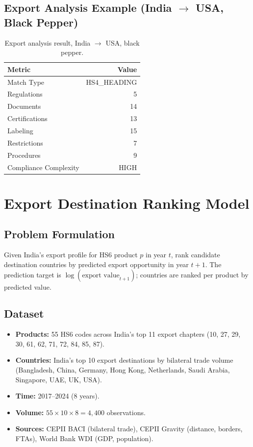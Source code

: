 \documentclass[conference]{IEEEtran}
\newcommand{\arrowto}{$\rightarrow$}
\begin{document}
\subsection{Export Analysis Example (India \arrowto{} USA, Black Pepper)}
\begin{table}[h]
\centering
\caption{Export analysis result, India \arrowto{} USA, black pepper.}
\label{tab:export}
\begin{tabular}{@{}lr@{}}
\toprule
\textbf{Metric} & \textbf{Value} \\
\midrule
Match Type            & HS4\_HEADING \\
Regulations           & 5 \\
Documents             & 14 \\
Certifications        & 13 \\
Labeling              & 15 \\
Restrictions          & 7 \\
Procedures            & 9 \\
Compliance Complexity & HIGH \\
\bottomrule
\end{tabular}
\end{table}

\section{Export Destination Ranking Model}

\subsection{Problem Formulation}
Given India's export profile for HS6 product $p$ in year $t$, rank
candidate destination countries by predicted export opportunity in year
$t{+}1$. The prediction target is $\log(\text{export value}_{t+1})$;
countries are ranked per product by predicted value.

\subsection{Dataset}
\begin{itemize}
\item \textbf{Products:} 55 HS6 codes across India's top 11 export
chapters (10, 27, 29, 30, 61, 62, 71, 72, 84, 85, 87).
\item \textbf{Countries:} India's top 10 export destinations by bilateral
trade volume (Bangladesh, China, Germany, Hong Kong, Netherlands, Saudi
Arabia, Singapore, UAE, UK, USA).
\item \textbf{Time:} 2017--2024 (8 years).
\item \textbf{Volume:} $55 \times 10 \times 8 = 4{,}400$ observations.
\item \textbf{Sources:} CEPII BACI (bilateral trade), CEPII Gravity
(distance, borders, FTAs), World Bank WDI (GDP, population).
\end{itemize}
\end{document}
